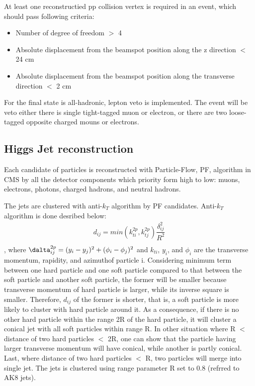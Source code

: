 At least one reconstructied pp collision vertex is required in an event, which should pass following criteria:
\begin{itemize}[noitemsep]
\item Number of degree of freedom $>$ 4
\item Absolute displacement from the beamspot position along the z direction $<$ 24 cm
\item Absolute displacement from the beamspot position along the transverse direction $<$ 2 cm
\end{itemize}


For the final state is all-hadronic, lepton veto is implemented. The event will be veto either there is single tight-tagged muon or electron, or there are two loose-tagged opposite charged mouns or electrons.

\subsection{Higgs Jet reconstruction} 
Each candidate of particles is reconstructed with Particle-Flow, PF, algorithm in CMS by all the detector components which priority form high to low: muons, electrons, photons, charged hadrons, and neutral hadrons.

The jets are clustered with anti-$k_{T}$ algorithm by PF candidates. Anti-$k_{T}$ algorithm is done desribed below: 
\begin{equation} \label{eq1}
\begin{split}
d_{ij} = min(k^{2p}_{ti},k^{2p}_{tj})\dfrac{\delta ^2_{ij}}{R^2}\\
\end{split}
\end{equation}
, where $\dalta ^{2p}_{ij}= (y_{i}-y_{j})^2+(\phi_{i}-\phi_{j})^2$ and $k_{ti}$, $y_{i}$, and $\phi _{i}$ are the transverse momentum, rapidity, and azimuthof particle i.
Considering minimum term between one hard particle and one soft particle compared to that between the soft particle and another soft particle, the former will be smaller because transverse momentum of hard particle is larger, while its inverse square is smaller. 
Therefore, $d_{ij}$ of the former is shorter, that is, a soft particle is more likely to cluster with hard particle around it. 
As a consequence, if there is no other hard particle within the range 2R of the hard particle, it will cluster a conical jet with all soft particles within range R. 
In other situation where R $<$ distance of two hard particles $<$ 2R, one can show that the particle having larger transverse momentum will have conical, while another is partly conical.
Last, where distance of two hard particles $<$ R, two particles will merge into single jet. The jets is clustered using range parameter R set to 0.8 (refrred to AK8 jets).

